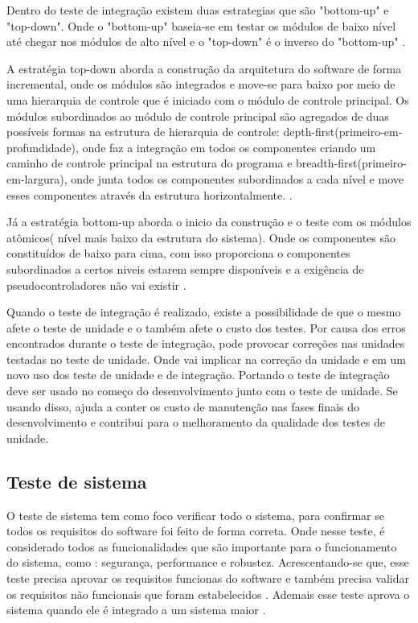     
    Dentro do teste de integração existem duas estrategias que são "bottom-up" e "top-down". Onde o "bottom-up" baseia-se em testar os módulos de baixo nível até chegar nos módulos de alto nível e o "top-down" é o inverso do "bottom-up" \cite{CidinhaCostaGouveia}.
	
    A estratégia top-down aborda a construção da arquitetura do software de forma incremental, onde os módulos são integrados e move-se para baixo por meio de uma hierarquia de controle que é iniciado com o módulo de controle principal. Os módulos subordinados ao módulo de controle principal são agregados de duas possíveis  formas na estrutura de hierarquia de controle: depth-first(primeiro-em-profundidade), onde faz a integração em todos os componentes criando um caminho de controle principal na estrutura do programa e breadth-first(primeiro-em-largura), onde junta todos os componentes subordinados a cada nível e move esses componentes através da estrutura horizontalmente. \cite{pressman}.
    
    Já a estratégia bottom-up aborda o inicio da construção e o teste com os módulos atômicos( nível mais baixo da estrutura do sistema). Onde os componentes são constituídos de baixo para cima, com isso proporciona o componentes subordinados a certos niveis estarem sempre disponíveis e a exigência de pseudocontroladores não vai existir \cite{pressman}.
   
    Quando o teste de integração é realizado, existe a possibilidade de que o mesmo afete o teste de unidade e o  também afete o custo dos testes. Por causa dos erros encontrados durante o teste de integração, pode provocar correções nas unidades testadas no teste de unidade. Onde vai implicar na correção da unidade e em um novo uso dos teste de unidade e de integração. Portando o teste de integração deve ser usado no começo do desenvolvimento junto com o teste de unidade. Se usando disso, ajuda a conter os custo de manutenção nas fases finais do desenvolvimento e contribui para o melhoramento da qualidade dos testes de unidade. \cite{MARLLOSPAIVAPRADO} 
    
    
    
    
\subsection{Teste de sistema}
\label{sec:Teste de sistema}
	O teste de sistema tem como foco verificar todo o sistema, para confirmar se todos os requisitos do software foi feito de forma correta. Onde nesse teste, é considerado todos as funcionalidades que são importante para o funcionamento do sistema, como : segurança, performance e robustez\cite{LivroAutomatizacao}.
    Acrescentando-se que, esse teste precisa aprovar os requisitos funcionas do software e  também precisa validar os requisitos não funcionais que foram estabelecidos \cite{ReginaldoRe}. Ademais esse teste aprova o sistema quando ele é integrado a um sistema maior \cite{pressman}.
    

